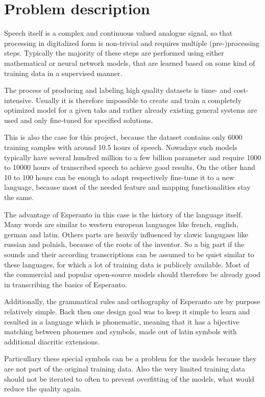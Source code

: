 \chapter{Problem description}
\label{problem}
Speech itself is a complex and continuous valued analogue signal, so that processing in digitalized form is non-trivial and requires multiple (pre-)processing steps.
Typically the majority of these steps are performed using either mathematical or neural network models, that are learned based on some kind of training data in a supervised manner.

The process of producing and labeling high quality datasets is time- and cost-intensive. 
Usually it is therefore impossible to create and train a completely optimized model for a given taks and rather already existing general systems are used and only fine-tuned for specified solutions.

This is also the case for this project, because the dataset contains only 6000 training samples with around 10.5 hours of speech. 
Nowadays such models typically have several hundred million to a few billion parameter and require 1000 to 10000 hours of transcribed speech to achieve good results.
On the other hand 10 to 100 hours can be enough to adapt respectively fine-tune it to a new language, because most of the needed feature and mapping functionalities stay the same.

The advantage of Esperanto in this case is the history of the language itself.
Many words are similar to western european languages like french, english, german and latin.
Others parts are heavily influenced by slawic langugaes like russian and polnish, because of the roots of the inventor.
So a big part if the sounds and their according transcriptions can be assumed to be quiet similar to these languages, for which a lot of training data is publicely available.
Most of the commercial and popular open-source models should therefore be already good in transcribing the basics of Esperanto. 

Additionally, the grammatical rules and orthography of Esperanto are by purpose relatively simple.
Back then one design goal was to keep it simple to learn and resulted in a language which is phonematic, meaning that it has a bijective matching between phonemes and symbols, made out of latin symbols with additional diacritic extensions.

Particullary these special symbols can be a problem for the models because they are not part of the original training data. 
Also the very limited training data should not be iterated to often to prevent overfitting of the models, what would reduce the quality again.

